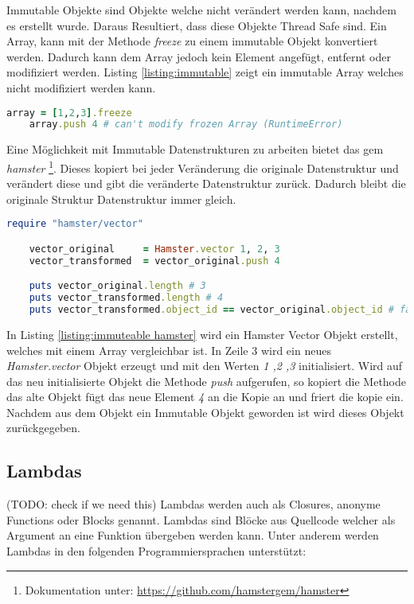 Immutable Objekte sind Objekte welche nicht verändert werden kann, nachdem es erstellt wurde. Daraus Resultiert, dass diese Objekte Thread Safe sind. Ein Array, kann mit der Methode \emph{freeze} zu einem immutable Objekt konvertiert werden. Dadurch kann dem Array jedoch kein Element angefügt, entfernt oder modifiziert werden. Listing \ref{listing:immutable} zeigt ein immutable Array welches nicht modifiziert werden kann. 

\begin{lstlisting}[language=Ruby,label={listing:immutable}]
	array = [1,2,3].freeze
	array.push 4 # can't modify frozen Array (RuntimeError)
\end{lstlisting}

Eine Möglichkeit mit Immutable Datenstrukturen zu arbeiten bietet das gem \emph{hamster} \footnote{Dokumentation unter: \url{https://github.com/hamstergem/hamster}}. Dieses kopiert bei jeder Veränderung die originale Datenstruktur und verändert diese und gibt die veränderte Datenstruktur zurück. Dadurch bleibt die originale Struktur Datenstruktur immer gleich. 

\begin{lstlisting}[language=Ruby,label={listing:immuteable hamster}]
	require "hamster/vector"

	vector_original     = Hamster.vector 1, 2, 3
	vector_transformed  = vector_original.push 4

	puts vector_original.length # 3
	puts vector_transformed.length # 4
	puts vector_transformed.object_id == vector_original.object_id # false
\end{lstlisting}

In Listing \ref{listing:immuteable hamster} wird ein Hamster Vector Objekt erstellt, welches mit einem Array vergleichbar ist. In Zeile 3 wird ein neues \emph{Hamster.vector} Objekt erzeugt und mit den Werten \emph{1 ,2 ,3} initialisiert. Wird auf das neu initialisierte Objekt die Methode \emph{push} aufgerufen, so kopiert die Methode das alte Objekt fügt das neue Element \emph{4} an die Kopie an und friert die kopie ein. Nachdem aus dem Objekt ein Immutable Objekt geworden ist wird dieses Objekt zurückgegeben.



\subsection{Lambdas}
(TODO: check if we need this)
Lambdas werden auch als Closures, anonyme Functions oder Blocks genannt. Lambdas sind Blöcke aus Quellcode welcher als Argument an eine Funktion übergeben werden kann. Unter anderem werden Lambdas in den folgenden Programmiersprachen unterstützt:

